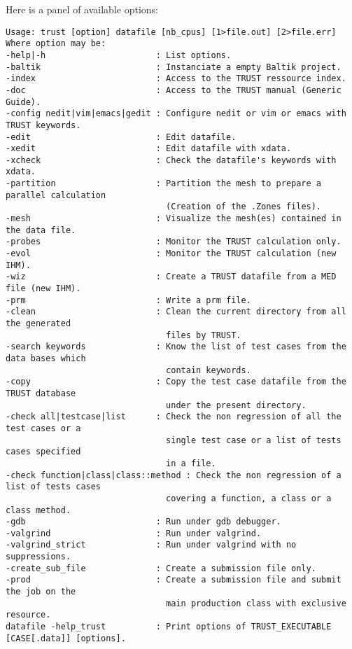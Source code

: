 Here is a panel of available options:
\begin{verbatim}
Usage: trust [option] datafile [nb_cpus] [1>file.out] [2>file.err]
Where option may be:
-help|-h                      : List options.
-baltik                       : Instanciate a empty Baltik project.
-index                        : Access to the TRUST ressource index.
-doc                          : Access to the TRUST manual (Generic Guide).
-config nedit|vim|emacs|gedit : Configure nedit or vim or emacs with TRUST keywords.
-edit                         : Edit datafile.
-xedit                        : Edit datafile with xdata.
-xcheck                       : Check the datafile's keywords with xdata.
-partition                    : Partition the mesh to prepare a parallel calculation 
                                (Creation of the .Zones files).
-mesh                         : Visualize the mesh(es) contained in the data file.
-probes                       : Monitor the TRUST calculation only.
-evol                         : Monitor the TRUST calculation (new IHM).
-wiz                          : Create a TRUST datafile from a MED file (new IHM).
-prm                          : Write a prm file.
-clean                        : Clean the current directory from all the generated 
                                files by TRUST.
-search keywords              : Know the list of test cases from the data bases which 
                                contain keywords.
-copy                         : Copy the test case datafile from the TRUST database 
                                under the present directory. 
-check all|testcase|list      : Check the non regression of all the test cases or a 
                                single test case or a list of tests cases specified 
                                in a file.
-check function|class|class::method : Check the non regression of a list of tests cases
                                covering a function, a class or a class method.
-gdb                          : Run under gdb debugger.
-valgrind                     : Run under valgrind.
-valgrind_strict              : Run under valgrind with no suppressions. 
-create_sub_file              : Create a submission file only. 
-prod                         : Create a submission file and submit the job on the 
                                main production class with exclusive resource. 
datafile -help_trust          : Print options of TRUST_EXECUTABLE [CASE[.data]] [options]. 
\end{verbatim}


